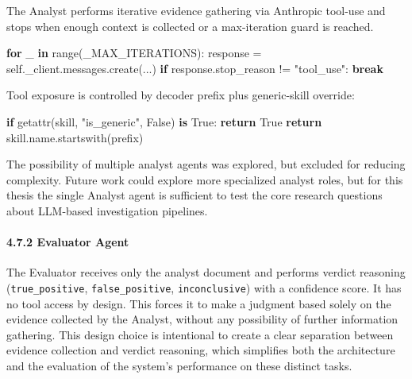 \documentclass[
]{article}
\newenvironment{Shaded}{}{}
\newcommand{\BuiltInTok}[1]{\textcolor[rgb]{0.00,0.50,0.00}{#1}}
\newcommand{\ControlFlowTok}[1]{\textcolor[rgb]{0.00,0.44,0.13}{\textbf{#1}}}
\newcommand{\KeywordTok}[1]{\textcolor[rgb]{0.00,0.44,0.13}{\textbf{#1}}}
\newcommand{\NormalTok}[1]{#1}
\newcommand{\OperatorTok}[1]{\textcolor[rgb]{0.40,0.40,0.40}{#1}}
\newcommand{\StringTok}[1]{\textcolor[rgb]{0.25,0.44,0.63}{#1}}
\newcommand{\VariableTok}[1]{\textcolor[rgb]{0.10,0.09,0.49}{#1}}
\begin{document}
The Analyst performs iterative evidence gathering via Anthropic tool-use
and stops when enough context is collected or a max-iteration guard is
reached.

\begin{Shaded}
\begin{Highlighting}[]
\ControlFlowTok{for}\NormalTok{ \_ }\KeywordTok{in} \BuiltInTok{range}\NormalTok{(\_MAX\_ITERATIONS):}
\NormalTok{    response }\OperatorTok{=} \VariableTok{self}\NormalTok{.\_client.messages.create(...)}
    \ControlFlowTok{if}\NormalTok{ response.stop\_reason }\OperatorTok{!=} \StringTok{"tool\_use"}\NormalTok{:}
        \ControlFlowTok{break}
\end{Highlighting}
\end{Shaded}

Tool exposure is controlled by decoder prefix plus generic-skill
override:

\begin{Shaded}
\begin{Highlighting}[]
\ControlFlowTok{if} \BuiltInTok{getattr}\NormalTok{(skill, }\StringTok{"is\_generic"}\NormalTok{, }\VariableTok{False}\NormalTok{) }\KeywordTok{is} \VariableTok{True}\NormalTok{:}
    \ControlFlowTok{return} \VariableTok{True}
\ControlFlowTok{return}\NormalTok{ skill.name.startswith(prefix)}
\end{Highlighting}
\end{Shaded}

The possibility of multiple analyst agents was explored, but excluded
for reducing complexity. Future work could explore more specialized
analyst roles, but for this thesis the single Analyst agent is
sufficient to test the core research questions about LLM-based
investigation pipelines.

\paragraph{4.7.2 Evaluator Agent}\label{evaluator-agent}

The Evaluator receives only the analyst document and performs verdict
reasoning (\texttt{true\_positive}, \texttt{false\_positive},
\texttt{inconclusive}) with a confidence score. It has no tool access by
design. This forces it to make a judgment based solely on the evidence
collected by the Analyst, without any possibility of further information
gathering. This design choice is intentional to create a clear
separation between evidence collection and verdict reasoning, which
simplifies both the architecture and the evaluation of the system's
performance on these distinct tasks.
\end{document}
